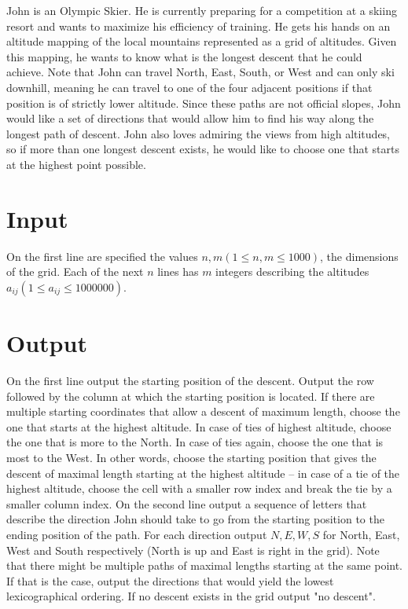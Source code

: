 
John is an Olympic Skier. He is currently preparing for a competition at a skiing resort and wants to maximize his efficiency of training. He gets his hands on an altitude mapping of the local mountains represented as a grid of altitudes. Given this mapping, he wants to know what is the longest descent that he could achieve. Note that John can travel North, East, South, or West and can only ski downhill, meaning he can travel to one of the four adjacent positions if that position is of strictly lower altitude. Since these paths are not official slopes, John would like a set of directions that would allow him to find his way along the longest path of descent. John also loves admiring the views from high altitudes, so if more than one longest descent exists, he would like to choose one that starts at the highest point possible.


\section*{Input}
On the first line are specified the values $n, m (1 \leq n, m \leq 1000)$, the dimensions of the grid.
Each of the next $n$ lines has $m$ integers describing the altitudes $a_{ij} (1 \leq a_{ij} \leq 1000000)$.

\section*{Output}
On the first line output the starting position of the descent. Output the row followed by the column at which the starting position is located. If there are multiple starting coordinates that allow a descent of maximum length, choose the one that starts at the highest altitude. In case of ties of highest altitude, choose the one that is more to the North. In case of ties again, choose the one that is most to the West. In other words, choose
the starting position that gives the descent of maximal length starting at the highest altitude -- in case of a tie of the highest altitude, choose the cell with a smaller row index and break the tie by a smaller column index.
On the second line output a sequence of letters that describe the direction John should take to go from the starting position to the ending position of the path. For each direction output $N, E, W, S$ for North, East, West and South respectively (North is up and East is right in the grid). Note that there might be multiple paths of maximal lengths starting at the same point. If that is the case, output the directions that would yield the lowest lexicographical ordering.
If no descent exists in the grid output "no descent".
